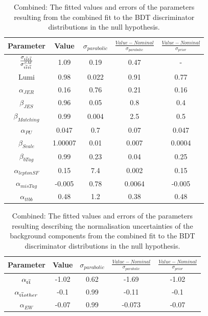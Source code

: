 \begin{table}[ht!]
\centering
\begin{tabular}{| c c cc c |}
\hline  
  Parameter &   Value & $\sigma_{parabolic}$ &    $\frac{Value-Nominal}{\sigma_{parabolic}}$ &    $\frac{Value-Nominal}{\sigma_{prior}}$ \\
\hline   
$\frac{\sigma_{\mathrm{t}\overline{\mathrm{t}}\mathrm{t}\overline{\mathrm{t}}}}{\sigma^{SM}_{\mathrm{t}\overline{\mathrm{t}}\mathrm{t}\overline{\mathrm{t}}}}$  & 1.09  & 0.19 & 0.47 & - \\
    \hline  
    Lumi  &   0.98 &  0.022  & 0.91 & 0.77 \\
    \hline  
    $\alpha_{JER}$ &   0.16 &  0.76   & 0.21 & 0.16 \\  
    \hline  
    $\beta_{JES}$  & 0.96  & 0.05   & 0.8  &  0.4  \\
    \hline   
    $\beta_{Matching}$ & 0.99 &  0.004   & 2.5  & 0.5 \\  
    \hline  
    $\alpha_{PU}$  & 0.047  & 0.7 &  0.07 & 0.047 \\
    \hline  
    $\beta_{Scale}$  & 1.00007  & 0.01   & 0.007  & 0.0004 \\ 
    \hline  
    $\beta_{bTag}$ & 0.99    & 0.23   & 0.04   &  0.25 \\
    \hline  
    $\alpha_{leptonSF}$ & 0.15 & 7.4    & 0.002    &  0.15 \\   
    \hline  
    $\alpha_{misTag}$ & -0.005   & 0.78   & 0.0064  & -0.005 \\
    \hline  
    $\alpha_{ttbb}$  & 0.48  & 1.2 & 0.38  & 0.48\\
    \hline
\end{tabular}
\caption{Combined: The fitted values and errors of the parameters resulting from the combined fit to the BDT discriminator distributions in the null hypothesis.}
\label{tab:fittedparams4}
\end{table}

\begin{table}[ht!]
\centering
\begin{tabular}{| c c cc c |}
 \hline  
    Parameter &   Value & $\sigma_{parabolic}$ &    $\frac{Value-Nominal}{\sigma_{parabolic}}$ &    $\frac{Value-Nominal}{\sigma_{prior}}$ \\
    \hline   
    $\alpha_{\mathrm{t}\overline{\mathrm{t}}}$ &   -1.02 &  0.62 &  -1.69 & -1.02 \\  
    \hline  
    $\alpha_{\mathrm{t}\overline{\mathrm{t}} other}$  & -0.1  & 0.99 & -0.11  & -0.1  \\
    \hline   
    $\alpha_{EW}$ & -0.07 &  0.99 &  -0.073 & -0.07  \\  
    \hline  
\end{tabular}
\caption{Combined: The fitted values and errors of the parameters resulting describing the normalisation uncertainties of the background components from the combined fit to the BDT discriminator distributions in the null hypothesis. }
\label{tab:fittedparams5}
\end{table}



